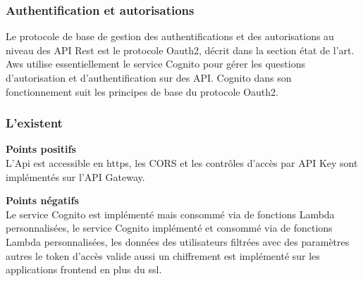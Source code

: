 \subsubsection{Authentification et autorisations}
Le protocole de base de gestion des authentifications et des autorisations au niveau des API Rest est le protocole Oauth2, décrit dans la section état de l'art. Aws utilise essentiellement le service Cognito pour gérer les questions d'autorisation et d'authentification sur des API. Cognito dans son fonctionnement suit les principes de base du protocole Oauth2. 

\subsubsection{L'existent}

\textbf{Points positifs}\\
L'Api est accessible en https, les CORS et les contrôles d'accès par API Key sont implémentés sur l'API Gateway.

\textbf{Points négatifs}\\
Le service Cognito est implémenté  mais consommé via de fonctions Lambda personnalisées, le service Cognito implémenté  et consommé via de fonctions Lambda personnalisées,
les données des utilisateurs filtrées avec des paramètres autres le token d'accès valide aussi un chiffrement  est implémenté sur les applications frontend en plus du ssl. 

